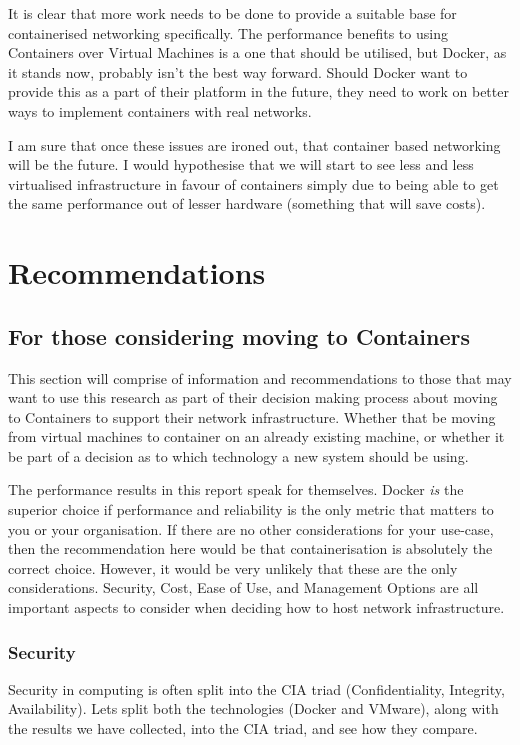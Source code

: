 It is clear that more work needs to be done to provide a suitable base for containerised networking specifically. The performance benefits to using Containers over Virtual Machines is a one that should be utilised, but Docker, as it stands now, probably isn't the best way forward. Should Docker want to provide this as a part of their platform in the future, they need to work on better ways to implement containers with real networks.

I am sure that once these issues are ironed out, that container based networking will be the future. I would hypothesise that we will start to see less and less virtualised infrastructure in favour of containers simply due to being able to get the same performance out of lesser hardware (something that will save costs).

\chapter{Recommendations}

\section{For those considering moving to Containers}
\label{sec:RecSMEs}
This section will comprise of information and recommendations to those that may want to use this research as part of their decision making process about moving to Containers to support their network infrastructure. Whether that be moving from virtual machines to container on an already existing machine, or whether it be part of a decision as to which technology a new system should be using.

The performance results in this report speak for themselves. Docker \emph{is} the superior choice if performance and reliability is the only metric that matters to you or your organisation. If there are no other considerations for your use-case, then the recommendation here would be that containerisation is absolutely the correct choice. However, it would be very unlikely that these are the only considerations. Security, Cost, Ease of Use, and Management Options are all important aspects to consider when deciding how to host network infrastructure.
\subsection{Security}
Security in computing is often split into the CIA triad (Confidentiality, Integrity, Availability). Lets split both the technologies (Docker and VMware), along with the results we have collected, into the CIA triad, and see how they compare.
